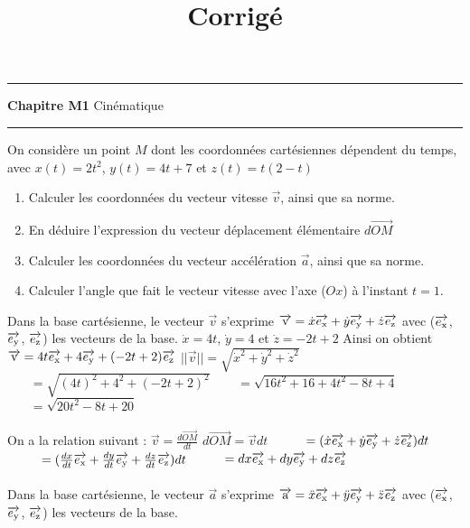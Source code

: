 \documentclass[11pt]{article}
\title{\bf{\pagetitle}\n\large{Corrigé}}
\def\pagetitle{Cinématique}
\begin{document}



\thispagestyle{fancy}
\fancyhead[C]{\pagetitle}

\hrule
\begin{center}
    \LARGE{\textbf{Chapitre M1}}\n
    \large{\pagetitle}\n
    \rule{0.8\textwidth}{0.5pt}
\end{center}

\vspace{0.5cm}

\begin{app}{}{}
    On considère un point $M$ dont les coordonnées cartésiennes dépendent du temps, avec \n
    $x(t) = 2t^{2}$, $y(t) = 4t + 7$ et $z(t) = t(2-t)$
    \begin{enumerate}
        \item Calculer les coordonnées du vecteur vitesse $\Vec{v}$, ainsi que sa norme.
        \item En déduire l’expression du vecteur déplacement élémentaire $d \Vec{OM}$
        \item Calculer les coordonnées du vecteur accélération $\Vec{a}$, ainsi que sa norme.
        \item Calculer l’angle que fait le vecteur vitesse avec l’axe ($Ox$) à l’instant $t = 1$.
    \end{enumerate}
    \tcblower
     Dans la base cartésienne, le vecteur $\Vec{v}$ s'exprime $\overrightarrow{\text{v}} = \Dot{x} \overrightarrow{e_{\text{x}}} + \Dot{y} \overrightarrow{e_{\text{y}}} + \Dot{z} \overrightarrow{e_{\text{z}}}$ avec ($\overrightarrow{e_{\text{x}}}$, $\overrightarrow{e_{\text{y}}}$, $\overrightarrow{e_{\text{z}}}$) les vecteurs de la base.\n
    $\Dot{x} = 4t$, $\Dot{y} = 4$ et $\Dot{z} = -2t + 2$\n
    Ainsi on obtient $\overrightarrow{\text{v}} = 4t \overrightarrow{e_{\text{x}}} + 4 \overrightarrow{e_{\text{y}}} + (-2t + 2) \overrightarrow{e_{\text{z}}}$\n
    $||\Vec{v}|| = \sqrt{\Dot{x}^{2} + \Dot{y}^{2} + \Dot{z}^{2}}$\n
    $~~~~~~~~ = \sqrt{(4t)^{2} + 4^{2} + (-2t + 2)^{2}}$\n
    $~~~~~~~~ = \sqrt{16t^{2} + 16 + 4t^{2} - 8t + 4}$\n
    $~~~~~~~~ = \sqrt{20t^{2} - 8t + 20}$\\\\
     On a la relation suivant : $\Vec{v} = \frac{d \Vec{OM}}{dt}$\n
    $d \Vec{OM} = \Vec{v} dt$\n
    $~~~~~~~~ = (\Dot{x} \overrightarrow{e_{\text{x}}} + \Dot{y} \overrightarrow{e_{\text{y}}} + \Dot{z} \overrightarrow{e_{\text{z}}}) dt$\n
    $~~~~~~~~ = (\frac{dx}{dt} \overrightarrow{e_{\text{x}}} + \frac{dy}{dt} \overrightarrow{e_{\text{y}}} + \frac{dz}{dt} \overrightarrow{e_{\text{z}}}) dt$\n
    $~~~~~~~~ = dx \overrightarrow{e_{\text{x}}} + dy \overrightarrow{e_{\text{y}}} + dz \overrightarrow{e_{\text{z}}}$\\\\
     Dans la base cartésienne, le vecteur $\Vec{a}$ s'exprime $\overrightarrow{\text{a}} = \Ddot{x} \overrightarrow{e_{\text{x}}} + \Ddot{y} \overrightarrow{e_{\text{y}}} + \Ddot{z} \overrightarrow{e_{\text{z}}}$ avec ($\overrightarrow{e_{\text{x}}}$, $\overrightarrow{e_{\text{y}}}$, $\overrightarrow{e_{\text{z}}}$) les vecteurs de la base.\n

\end{app}
\end{document}
